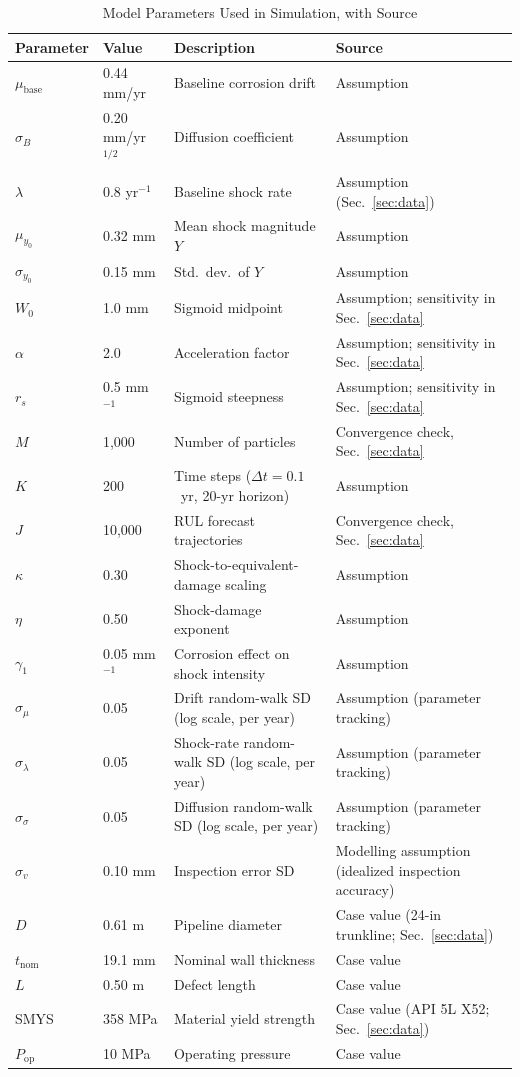 \documentclass[journal]{IEEEtran}
\begin{document}
\begin{table}[t]
\centering
\caption{Model Parameters Used in Simulation, with Source}
\label{tab:simparams}
\begin{tabular}{p{0.9cm}p{1.2cm}p{2.5cm}p{2.6cm}}
\toprule
Parameter & Value & Description & Source \\
\midrule
$\mu_{\mathrm{base}}$ & 0.44 mm/yr & Baseline corrosion drift & Assumption \\
$\sigma_B$ & 0.20 mm/yr$^{1/2}$ & Diffusion coefficient & Assumption \\
$\lambda$ & 0.8 yr$^{-1}$ & Baseline shock rate & Assumption (Sec.~\ref{sec:data}) \\
$\mu_{y_0}$ & 0.32 mm & Mean shock magnitude $Y$ & Assumption \\
$\sigma_{y_0}$ & 0.15 mm & Std.\ dev.\ of $Y$ & Assumption \\
$W_0$ & 1.0 mm & Sigmoid midpoint & Assumption; sensitivity in Sec.~\ref{sec:data} \\
$\alpha$ & 2.0 & Acceleration factor & Assumption; sensitivity in Sec.~\ref{sec:data} \\
$r_s$ & 0.5 mm$^{-1}$ & Sigmoid steepness & Assumption; sensitivity in Sec.~\ref{sec:data} \\
$M$ & 1{,}000 & Number of particles & Convergence check, Sec.~\ref{sec:data} \\
$K$ & 200 & Time steps ($\Delta t=0.1$~yr, 20-yr horizon) & Assumption \\
$J$ & 10{,}000 & RUL forecast trajectories & Convergence check, Sec.~\ref{sec:data} \\
\midrule
$\kappa$ & 0.30 & Shock-to-equivalent-damage scaling & Assumption \\
$\eta$ & 0.50 & Shock-damage exponent & Assumption \\
$\gamma_1$ & 0.05 mm$^{-1}$ & Corrosion effect on shock intensity & Assumption \\
$\sigma_\mu$ & 0.05 & Drift random-walk SD (log scale, per year) & Assumption (parameter tracking) \\
$\sigma_\lambda$ & 0.05 & Shock-rate random-walk SD (log scale, per year) & Assumption (parameter tracking) \\
$\sigma_\sigma$ & 0.05 & Diffusion random-walk SD (log scale, per year) & Assumption (parameter tracking) \\
$\sigma_v$ & 0.10 mm & Inspection error SD & Modelling assumption (idealized inspection accuracy) \\
$D$ & 0.61 m & Pipeline diameter & Case value (24-in trunkline; Sec.~\ref{sec:data}) \\
$t_{\mathrm{nom}}$ & 19.1 mm & Nominal wall thickness & Case value \\
$L$ & 0.50 m & Defect length & Case value \\
SMYS & 358 MPa & Material yield strength & Case value (API 5L X52; Sec.~\ref{sec:data}) \\
$P_{\mathrm{op}}$ & 10 MPa & Operating pressure & Case value \\
\bottomrule
\end{tabular}
\end{table}
\end{document}
